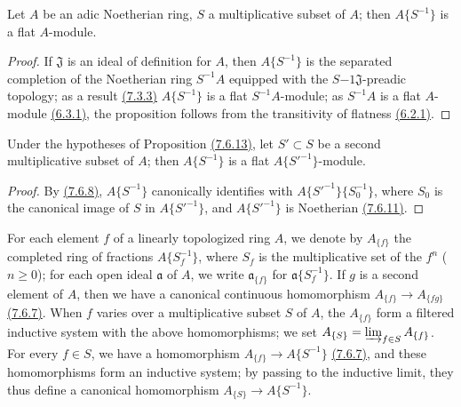 \begin{prop}[7.6.13]
\label{prop-0.7.6.13}
Let $A$ be an adic Noetherian ring, $S$ a multiplicative subset of $A$; then $A\{S^{-1}\}$ is a
flat $A$-module.
\end{prop}

\begin{proof}
\label{proof-prop-0.7.6.13}
If $\mathfrak{J}$ is an ideal of definition for $A$, then $A\{S^{-1}\}$ is the separated completion
of the Noetherian ring $S^{-1}A$ equipped with the $S{-1}\mathfrak{J}$-preadic topology; as a result
\hyperref[cor-0.7.3.3]{(7.3.3)} $A\{S^{-1}\}$ is a flat $S^{-1}A$-module; as $S^{-1}A$ is a flat
$A$-module \hyperref[env-0.6.3.1]{(6.3.1)}, the proposition follows from the transitivity of
flatness \hyperref[env-0.6.2.1]{(6.2.1)}.
\end{proof}

\begin{cor}[7.6.14]
\label{cor-0.7.6.14}
Under the hypotheses of Proposition \hyperref[prop-0.7.6.13]{(7.6.13)}, let $S'\subset S$ be a second
multiplicative subset of $A$; then $A\{S^{-1}\}$ is a flat $A\{{S'}^{-1}\}$-module.
\end{cor}

\begin{proof}
\label{proof-cor-0.7.6.14}
By \hyperref[env-0.7.6.8]{(7.6.8)}, $A\{S^{-1}\}$ canonically identifies with
$A\{{S'}^{-1}\}\{S_0^{-1}\}$, where $S_0$ is the canonical image of $S$ in $A\{{S'}^{-1}\}$, and
$A\{{S'}^{-1}\}$ is Noetherian \hyperref[prop-0.7.6.11]{(7.6.11)}.
\end{proof}

\begin{env}[7.6.15]
\label{env-0.7.6.15}
For each element $f$ of a linearly topologized ring $A$, we denote by $A_{\{f\}}$ the completed
ring of fractions $A\{S_f^{-1}\}$, where $S_f$ is the multiplicative set of the $f^n$
($n\geqslant 0$); for each open ideal $\mathfrak{a}$ of $A$, we write $\mathfrak{a}_{\{f\}}$ for
$\mathfrak{a}\{S_f^{-1}\}$. If $g$ is a second element of $A$, then we have a canonical continuous
homomorphism $A_{\{f\}}\to A_{\{fg\}}$ \hyperref[env-0.7.6.7]{(7.6.7)}. When $f$ varies over a
multiplicative subset $S$ of $A$, the $A_{\{f\}}$ form a filtered inductive system with the above
homomorphisms; we set $A_{\{S\}}=\varinjlim_{f\in S}A_{\{f\}}$. For every $f\in S$, we have a
homomorphism $A_{\{f\}}\to A\{S^{-1}\}$ \hyperref[env-0.7.6.7]{(7.6.7)}, and
these homomorphisms form an inductive system; by passing to the inductive limit, they thus define
a canonical homomorphism $A_{\{S\}}\to A\{S^{-1}\}$.
\end{env}

